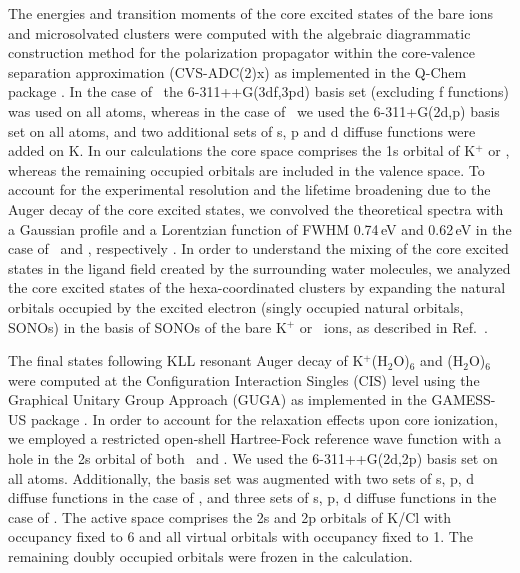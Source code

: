 The energies and transition moments of the core excited states of the bare ions and microsolvated clusters were computed with the algebraic diagrammatic construction method for the polarization propagator \citep{sch82:2395} within the core-valence separation approximation \citep{bar85:867,ced80:206,ced81:1038} (CVS-ADC(2)x) as implemented in the Q-Chem package \citep{Wenzel14:1900,Wenzel14:4583,Wormit14:774,QChem2015}. In the case of \cli~the 6-311++G(3df,3pd) basis set \citep{Krishnan80:650,McLean80:5639} (excluding f functions) was used on all atoms, whereas in the case of \ki~we used the 6-311+G(2d,p) basis set \citep{Krishnan80:650,Blaudeau97:5016} on all atoms, and two additional sets of s, p and d diffuse functions were added on K. %
In our calculations the core space comprises the 1s orbital of K$^{+}$ or \cli, whereas the remaining occupied orbitals are included in the valence space. %
To account for the experimental resolution and the lifetime broadening due to the Auger decay of the core excited states, we convolved the theoretical spectra with a Gaussian profile and a Lorentzian function of FWHM 0.74\,eV and 0.62\,eV in the case of \ki~and \cli, respectively \citep{Krause79:329}. In order to understand the mixing of the core excited states in the ligand field created by the surrounding water molecules, we analyzed the core excited states of the hexa-coordinated clusters by expanding the natural orbitals occupied by the excited electron (singly occupied natural orbitals, SONOs) in the basis of SONOs of the bare K$^{+}$ or \cli~ions, as described in Ref.\ \citep{miteva16:16671}. 


The final states following KLL resonant Auger decay of K$^{+}$(H$_2$O)$_6$ and \cli(H$_2$O)$_6$ were computed at the Configuration Interaction Singles (CIS) level using the Graphical Unitary Group Approach (GUGA) as implemented in the GAMESS-US package \citep{GUGA_PhysScr_21,GUGA_JCP_70,GUS}. In order to account for the relaxation effects upon core ionization, we employed a restricted open-shell Hartree-Fock reference wave function with a hole in the 2s orbital of both \ki~and \cli.  We used the 6-311++G(2d,2p) basis set \citep{Krishnan80:650,McLean80:5639,Blaudeau97:5016} on all atoms. Additionally, the basis set was augmented with two sets of s, p, d diffuse functions in the case of \ki, and three sets of s, p, d diffuse functions in the case of \cli. %
The active space comprises the 2s and 2p orbitals of K/Cl with occupancy fixed to 6 and all virtual orbitals with occupancy fixed to 1. The remaining doubly occupied orbitals were frozen in the calculation. \citep{mosnier16:061401}